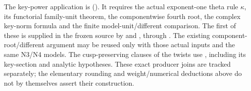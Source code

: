 The key-power application is
().
It requires the actual exponent-one theta rule \(\kappa\), its
functorial family-unit theorem, the componentwise fourth root,
the complex key-norm formula and the finite model-unit/different
comparison.
The first of these is supplied in the frozen source by
and , through
.
The existing component-root/different argument may be reused
only with those actual inputs and the same N3/N4 models.
The cusp-preserving clauses of the twists use
,
including its key-section and analytic hypotheses.
These exact producer joins are tracked separately; the elementary
rounding and weight/numerical deductions above do not by themselves
assert their construction.
